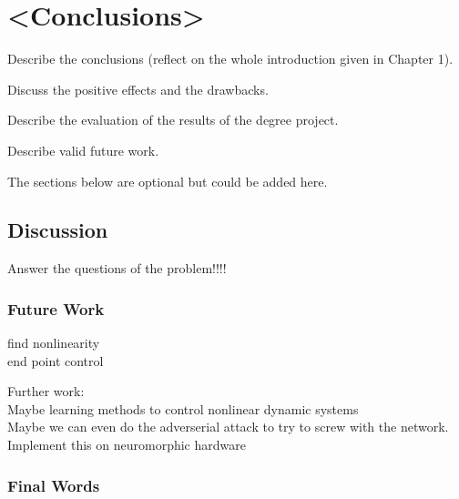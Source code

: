 \chapter{<Conclusions>}
Describe the conclusions (reflect on the whole introduction given in Chapter 1).

Discuss the positive effects and the drawbacks.

Describe the evaluation of the results of the degree project.

Describe valid future work.

The sections below are optional but could be added here.

\section{Discussion}

Answer the questions of the problem!!!!\\

\subsection{Future Work}
find nonlinearity\\
end point control\\

Further work:\\
Maybe learning methods to control nonlinear dynamic systems\\
Maybe we can even do the adverserial attack to try to screw with the network.\\
Implement this on neuromorphic hardware\\

\subsection{Final Words}

\listoftodos






